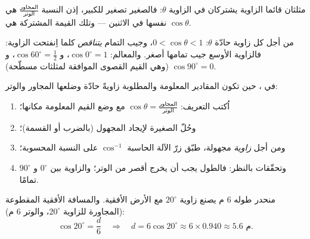 \begin{omfigure}

{\small مثلثان قائما الزاوية يشتركان في الزاوية $\theta$: فالصغير
تصغير للكبير، إذن النسبة
$\frac{\text{المجاور}}{\text{الوتر}}$ هي نفسها في الاثنين ---
وتلك القيمة المشتركة هي $\cos\theta$.}
\end{omfigure}

\begin{proposition}\label{prop:g8:cosine:bounds}
من أجل كل زاوية حادّة $\theta$: $0 < \cos\theta < 1$، وجيب التمام
\emph{يتناقص} كلما اِنفتحت الزاوية: فالزاوية الأوسع جيب تمامها أصغر.
والمعالم: $\cos 0^\circ = 1$، و $\cos 60^\circ = \frac12$،
و $\cos 90^\circ = 0$ (وهي القيم القصوى الموافقة لمثلثات
مسطّحة).
\end{proposition}
\admitted

\begin{method}\label{met:g8:cosine:use}
في ، حين تكون المقادير المعلومة والمطلوبة زاويةً
حادّة وضلعها المجاور والوتر:
\begin{enumerate}
  \item اُكتب التعريف:
        $\cos\theta = \frac{\text{المجاور}}{\text{الوتر}}$ مع
        وضع القيم المعلومة مكانها؛
  \item وحُلّ  الصغيرة لإيجاد المجهول (بالضرب أو القسمة)؛
  \item ومن أجل \emph{زاوية} مجهولة، طبّق زرّ الآلة الحاسبة
        $\cos^{-1}$ على النسبة المحسوبة؛
  \item وتحقّقات بالنظر: فالطول يجب أن يخرج أقصر من
        الوتر؛ والزاوية بين $0^\circ$ و
        $90^\circ$ تمامًا.
\end{enumerate}
\end{method}

\begin{example}\label{ex:g8:cosine:side}
منحدر طوله $6$ م يصنع زاوية $20^\circ$ مع الأرض الأفقية.
والمسافة الأفقية المقطوعة (المجاورة للزاوية $20^\circ$، والوتر
$6$ م):
\[
\cos 20^\circ = \frac{d}{6}
\quad\Longrightarrow\quad
d = 6 \cos 20^\circ \approx 6 \times 0.940 \approx 5.6 \text{ م}.
\]
\end{example}

